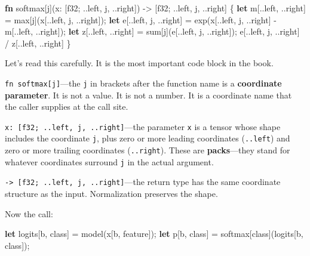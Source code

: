 \documentclass[11pt,titlepage]{article}
\newenvironment{Shaded}{}{}
\newcommand{\DataTypeTok}[1]{\textcolor[rgb]{0.56,0.13,0.00}{#1}}
\newcommand{\KeywordTok}[1]{\textcolor[rgb]{0.00,0.44,0.13}{\textbf{#1}}}
\newcommand{\NormalTok}[1]{#1}
\newcommand{\OperatorTok}[1]{\textcolor[rgb]{0.40,0.40,0.40}{#1}}
\begin{document}
\begin{Shaded}
\begin{Highlighting}[]
\KeywordTok{fn}\NormalTok{ softmax[j](x: }\OperatorTok{[}\DataTypeTok{f32}\NormalTok{; ..left, j, ..right}\OperatorTok{]}\NormalTok{)}
\NormalTok{    -> }\OperatorTok{[}\DataTypeTok{f32}\NormalTok{; ..left, j, ..right}\OperatorTok{]}
\OperatorTok{\{}
    \KeywordTok{let}\NormalTok{ m}\OperatorTok{[}\NormalTok{..left, ..right}\OperatorTok{]}\NormalTok{ = max}\OperatorTok{[}\NormalTok{j}\OperatorTok{]}\NormalTok{(x}\OperatorTok{[}\NormalTok{..left, j, ..right}\OperatorTok{]}\NormalTok{);}
    \KeywordTok{let}\NormalTok{ e}\OperatorTok{[}\NormalTok{..left, j, ..right}\OperatorTok{]}\NormalTok{ = exp(x}\OperatorTok{[}\NormalTok{..left, j, ..right}\OperatorTok{]}\NormalTok{ - m}\OperatorTok{[}\NormalTok{..left, ..right}\OperatorTok{]}\NormalTok{);}
    \KeywordTok{let}\NormalTok{ z}\OperatorTok{[}\NormalTok{..left, ..right}\OperatorTok{]}\NormalTok{ = sum}\OperatorTok{[}\NormalTok{j}\OperatorTok{]}\NormalTok{(e}\OperatorTok{[}\NormalTok{..left, j, ..right}\OperatorTok{]}\NormalTok{);}
\NormalTok{    e}\OperatorTok{[}\NormalTok{..left, j, ..right}\OperatorTok{]}\NormalTok{ / z}\OperatorTok{[}\NormalTok{..left, ..right}\OperatorTok{]}
\OperatorTok{\}}
\end{Highlighting}
\end{Shaded}

Let's read this carefully. It is the most important code block in the
book.

\texttt{fn\ softmax{[}j{]}}---the \texttt{j} in brackets after the
function name is a \textbf{coordinate parameter}. It is not a value. It
is not a number. It is a coordinate name that the caller supplies at the
call site.

\texttt{x:\ {[}f32;\ ..left,\ j,\ ..right{]}}---the parameter \texttt{x}
is a tensor whose shape includes the coordinate \texttt{j}, plus zero or
more leading coordinates (\texttt{..left}) and zero or more trailing
coordinates (\texttt{..right}). These are \textbf{packs}---they stand
for whatever coordinates surround \texttt{j} in the actual argument.

\texttt{-\textgreater{}\ {[}f32;\ ..left,\ j,\ ..right{]}}---the return
type has the same coordinate structure as the input. Normalization
preserves the shape.

Now the call:

\begin{Shaded}
\begin{Highlighting}[]
\KeywordTok{let}\NormalTok{ logits}\OperatorTok{[}\NormalTok{b, class}\OperatorTok{]}\NormalTok{ = model(x}\OperatorTok{[}\NormalTok{b, feature}\OperatorTok{]}\NormalTok{);}
\KeywordTok{let}\NormalTok{ p}\OperatorTok{[}\NormalTok{b, class}\OperatorTok{]}\NormalTok{ = softmax}\OperatorTok{[}\NormalTok{class}\OperatorTok{]}\NormalTok{(logits}\OperatorTok{[}\NormalTok{b, class}\OperatorTok{]}\NormalTok{);}
\end{Highlighting}
\end{Shaded}
\end{document}
